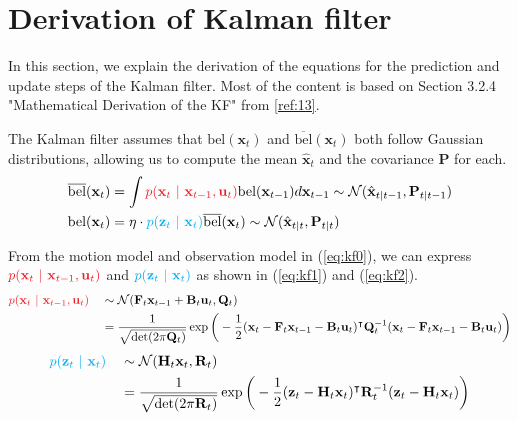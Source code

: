 \documentclass[10pt]{article}
\begin{document}
\section{Derivation of Kalman filter} \label{sec:derivkf}
In this section, we explain the derivation of the equations for the prediction and update steps of the Kalman filter. Most of the content is based on Section 3.2.4 "Mathematical Derivation of the KF" from \ref{ref:13}.

The Kalman filter assumes that $\text{bel}(\mathbf{x}_{t})$ and $\overline{\text{bel}}(\mathbf{x}_{t})$ both follow Gaussian distributions, allowing us to compute the mean $\hat{\mathbf{x}}_t$ and the covariance $\mathbf{P}$ for each.
\begin{equation} 
	\begin{aligned} 
		& \overline{\text{bel}}(\mathbf{x}_{t}) = \int {\color{Red} p(\mathbf{x}_{t} \ | \ \mathbf{x}_{t-1}, \mathbf{u}_{t}) } \text{bel}(\mathbf{x}_{t-1}) d \mathbf{x}_{t-1} \sim \mathcal{N}(\hat{\mathbf{x}}_{t|t-1}, \mathbf{P}_{t|t-1}) \\ 
		& \text{bel}(\mathbf{x}_{t}) = \eta \cdot {\color{Cyan} p( \mathbf{z}_{t} \ | \  \mathbf{x}_{t}) } \overline{\text{bel}}(\mathbf{x}_{t}) \sim \mathcal{N}(\hat{\mathbf{x}}_{t|t}, \mathbf{P}_{t|t})
	\end{aligned} 
\end{equation}

From the motion model and observation model in (\ref{eq:kf0}), we can express ${\color{Red} p(\mathbf{x}_{t} \ | \ \mathbf{x}_{t-1}, \mathbf{u}_{t}) }$ and ${\color{Cyan} p(\mathbf{z}_{t} \ | \ \mathbf{x}_{t})}$ as shown in (\ref{eq:kf1}) and (\ref{eq:kf2}).
\begin{equation} 
	\begin{aligned} 
		& {\color{Red} p(\mathbf{x}_{t} \ | \ \mathbf{x}_{t-1}, \mathbf{u}_{t}) }&& \sim \mathcal{N}(\mathbf{F}_{t}\mathbf{x}_{t-1} + \mathbf{B}_{t}\mathbf{u}_{t}, \mathbf{Q}_{t}) \\ 
		& && = \frac{1}{ \sqrt{\text{det}(2\pi \mathbf{Q}_t)}}\exp\bigg( -\frac{1}{2}(\mathbf{x}_{t} -\mathbf{F}_{t}\mathbf{x}_{t-1}-\mathbf{B}_{t}\mathbf{u}_t)^{\intercal}\mathbf{Q}_t^{-1}(\mathbf{x}_{t}-\mathbf{F}_{t}\mathbf{x}_{t-1}-\mathbf{B}_{t}\mathbf{u}_{t}) \bigg)\\  
	\end{aligned} 
\end{equation}
\begin{equation} 
	\begin{aligned} 
		& {\color{Cyan} p(\mathbf{z}_{t} \ | \ \mathbf{x}_{t}) } && \sim \mathcal{N}(\mathbf{H}_{t}\mathbf{x}_{t}, \mathbf{R}_{t}) \\ 
		& && = \frac{1}{ \sqrt{\text{det}(2\pi \mathbf{R}_t)}}\exp\bigg( -\frac{1}{2}(\mathbf{z}_{t}-\mathbf{H}_{t}\mathbf{x}_{t})^{\intercal}\mathbf{R}_{t}^{-1}(\mathbf{z}_{t}-\mathbf{H}_{t}\mathbf{x}_{t}) \bigg) 
	\end{aligned} 
\end{equation}
\end{document}
